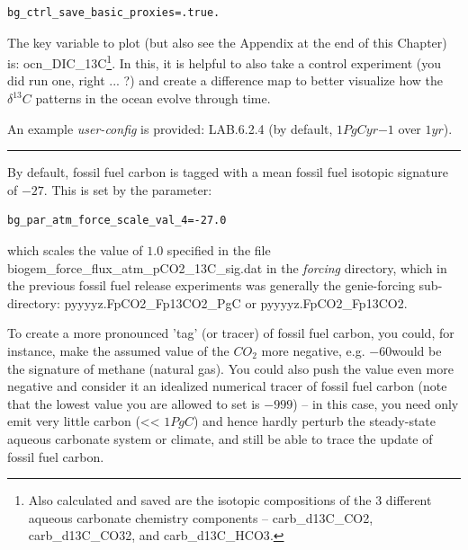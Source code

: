 \vspace{-1mm}\small\begin{verbatim}
bg_ctrl_save_basic_proxies=.true.
\end{verbatim}\normalsize\vspace{-1mm}

The key variable to plot (but also see the Appendix at the end of this Chapter) is: \textsf{\footnotesize ocn\_DIC\_13C}\footnote{Also calculated and saved are the isotopic compositions of the 3 different aqueous carbonate chemistry components -- \textsf{\footnotesize carb\_d13C\_CO2}, \textsf{\footnotesize carb\_d13C\_CO32}, and \textsf{\footnotesize carb\_d13C\_HCO3}.}. In this, it is helpful to also take a control experiment (you did run one, right ... ?) and create a difference map to better visualize how the \(\delta^{13}C\) patterns in the ocean evolve through time.

An example \textit{user-config} is provided: \textsf{\footnotesize LAB.6.2.4} (by default, $1PgC yr{-1}$ over $1 yr$).

\vspace{1mm} \noindent\rule{4cm}{0.1mm} \vspace{2mm}

\noindent By default, fossil fuel carbon is tagged with a mean fossil fuel isotopic signature of \(-27\)\permille. This is set by the parameter:
\vspace{-1mm}\small\begin{verbatim}
bg_par_atm_force_scale_val_4=-27.0
\end{verbatim}\normalsize\vspace{-1mm}
which scales the value of \(1.0\) specified in the file \textsf{\footnotesize biogem\_force\_flux\_atm\_pCO2\_13C\_sig.dat} in the \textit{forcing} directory, which in the previous fossil fuel release experiments was generally the \textsf{\footnotesize genie-forcing} sub-directory:  \textsf{\footnotesize pyyyyz.FpCO2\_Fp13CO2\_PgC} or \textsf{\footnotesize pyyyyz.FpCO2\_Fp13CO2}.


\vspace{1mm}
To create a more pronounced 'tag' (or tracer) of fossil fuel carbon, you could, for instance, make the assumed value of the \(CO_{2}\) more negative, e.g. \(-60\)\permille would be the signature of methane (natural gas). You could also push the value even more negative and consider it an idealized numerical tracer of fossil fuel carbon (note that the lowest value you are allowed to set is \(-999\)\permille) -- in this case, you need only emit very little carbon (<< $1PgC$) and hence hardly perturb the steady-state aqueous carbonate system or climate, and still be able to trace the update of fossil fuel carbon.


